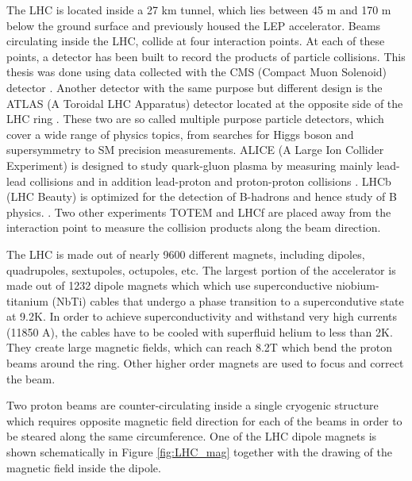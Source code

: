 The LHC is located inside a 27 km tunnel, which lies between 45 m and 170 m below the ground surface and previously housed the LEP accelerator. Beams circulating inside the LHC, collide at four interaction points. At each of these points, a detector has been built to record the products of particle collisions. This thesis was done using data collected with the CMS (Compact Muon Solenoid) detector \cite{Chatrchyan:2008aa}. Another detector with the same purpose but different design is the ATLAS (A Toroidal LHC Apparatus) detector located at the opposite side of the LHC ring \cite{Aad:2008zzm}. These two are so called multiple purpose particle detectors, which cover a wide range of physics topics, from searches for Higgs boson and supersymmetry to SM precision measurements. ALICE (A Large Ion Collider Experiment) is designed to study quark-gluon plasma by measuring mainly lead-lead collisions and in addition lead-proton and proton-proton collisions \cite{Aamodt:2008zz}. LHCb (LHC Beauty) is optimized for the detection of B-hadrons and hence study of B physics. \cite{Alves:2008zz}. Two other experiments TOTEM and LHCf are placed away from the interaction point to measure the collision products along the beam direction.
\par The LHC is made out of nearly 9600 different magnets, including dipoles, quadrupoles, sextupoles, octupoles, etc. The largest portion of the accelerator is made out of 1232 dipole magnets which which use superconductive niobium-titanium (NbTi) cables that undergo a phase transition to a supercondutive state at 9.2K. 
In order to achieve superconductivity and withstand very high currents (11850 A), the cables have to be cooled with superfluid helium to less than 2K. They create large magnetic fields, which can reach 8.2T which bend the proton beams around the ring. Other higher order magnets are used to focus and correct the beam. 
\par Two proton beams are counter-circulating inside a single cryogenic structure which requires opposite magnetic field direction for each of the beams in order to be steared along the same circumference. One of the LHC dipole magnets is shown schematically in Figure \ref{fig:LHC_mag} together with the drawing of the magnetic field inside the dipole. 
    
